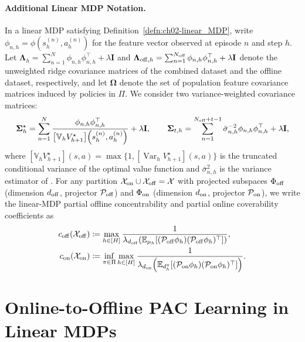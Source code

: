 \paragraph{Additional Linear MDP Notation.}
In a linear MDP satisfying Definition~\ref{defn:ch02-linear_MDP}, write $\phi_{n,h} = \phi(s_h^{(n)}, a_h^{(n)})$ for the feature vector observed at episode $n$ and step $h$. Let $\boldsymbol{\Lambda}_h = \sum_{n=1}^N \phi_{n,h}\phi_{n,h}^{\top}+\lambda\mathbf{I}$ and $\boldsymbol{\Lambda}_{{\operatorname{off}}, h} = \sum_{n=1}^{N_{{\operatorname{off}}}} \phi_{n,h}\phi_{n,h}^{\top}+\lambda\mathbf{I}$ denote the unweighted ridge covariance matrices of the combined dataset and the offline dataset, respectively, and let $\boldsymbol{\Omega}$ denote the set of population feature covariance matrices induced by policies in $\Pi$. We consider two variance-weighted covariance matrices:
\begin{equation}
    \boldsymbol{\Sigma}_{h}^{\star} = \sum_{n=1}^N \frac{\phi_{n,h}\phi_{n,h}^{\top}}{\left[\mathbb{V}_h V_{h+1}^\star\right]\!\left(s_h^{(n)}, a_h^{(n)}\right)}+\lambda\mathbf{I}, \qquad
    \boldsymbol{\Sigma}_{t,h} = \sum_{n=1}^{N_{{\operatorname{off}}}+t-1} \bar{\sigma}_{n,h}^{-2}\phi_{n,h}\phi_{n,h}^{\top}+\lambda\mathbf{I},
\end{equation}
where $[\mathbb{V}_h V_{h+1}^\star](s, a) = \max\{1, [\operatorname{Var}_h V_{h+1}^\star](s, a)\}$ is the truncated conditional variance of the optimal value function and $\bar{\sigma}_{n,h}^{2}$ is the variance estimator of \citet{he2023nearly}. For any partition ${\mathcal{X}}_{{\operatorname{on}}} \cup {\mathcal{X}}_{{\operatorname{off}}} = {\mathcal{X}}$ with projected subspaces $\Phi_{{\operatorname{off}}}$ (dimension $d_{{\operatorname{off}}}$, projector ${\mathcal{P}}_{{\operatorname{off}}}$) and $\Phi_{{\operatorname{on}}}$ (dimension $d_{{\operatorname{on}}}$, projector ${\mathcal{P}}_{{\operatorname{on}}}$), we write the linear-MDP partial offline concentrability and partial online coverability coefficients as
\begin{align}
    c_{{\operatorname{off}}}({\mathcal{X}}_{{\operatorname{off}}}) &\coloneqq \max_{h \in [H]} \frac{1}{\lambda_{d_{{\operatorname{off}}}}\!\left(\mathbb{E}_{\mu_h}[({\mathcal{P}}_{{\operatorname{off}}}\phi_h)({\mathcal{P}}_{{\operatorname{off}}}\phi_h)^{\top}]\right)}, \label{eq:ch02-c_off} \\
    c_{{\operatorname{on}}}({\mathcal{X}}_{{\operatorname{on}}}) &\coloneqq \inf_{\pi \in \Pi} \max_{h \in [H]} \frac{1}{\lambda_{d_{{\operatorname{on}}}}\!\left(\mathbb{E}_{d^\pi_h}[({\mathcal{P}}_{{\operatorname{on}}}\phi_h)({\mathcal{P}}_{{\operatorname{on}}}\phi_h)^{\top}]\right)}. \label{eq:ch02-c_on}
\end{align}

\section{Online-to-Offline PAC Learning in Linear MDPs}
\label{sec:ch02-lin-pac}

